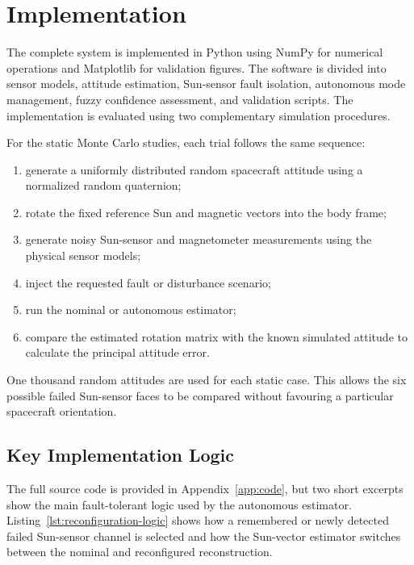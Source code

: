\documentclass[11pt,a4paper]{article}
\begin{document}
\clearpage

\section{Implementation}

The complete system is implemented in Python using NumPy for numerical operations and Matplotlib for validation figures. The software is divided into sensor models, attitude estimation, Sun-sensor fault isolation, autonomous mode management, fuzzy confidence assessment, and validation scripts. The implementation is evaluated using two complementary simulation procedures.

For the static Monte Carlo studies, each trial follows the same sequence:
\begin{enumerate}
    \item generate a uniformly distributed random spacecraft attitude using a normalized random quaternion;
    \item rotate the fixed reference Sun and magnetic vectors into the body frame;
    \item generate noisy Sun-sensor and magnetometer measurements using the physical sensor models;
    \item inject the requested fault or disturbance scenario;
    \item run the nominal or autonomous estimator;
    \item compare the estimated rotation matrix with the known simulated attitude to calculate the principal attitude error.
\end{enumerate}

One thousand random attitudes are used for each static case. This allows the six possible failed Sun-sensor faces to be compared without favouring a particular spacecraft orientation.


\subsection{Key Implementation Logic}

The full source code is provided in Appendix~\ref{app:code}, but two short excerpts show the main fault-tolerant logic used by the autonomous estimator. Listing~\ref{lst:reconfiguration-logic} shows how a remembered or newly detected failed Sun-sensor channel is selected and how the Sun-vector estimator switches between the nominal and reconfigured reconstruction.


\end{document}
